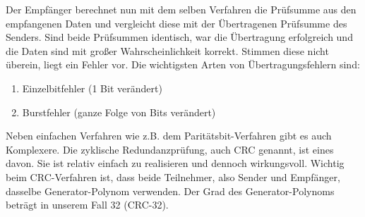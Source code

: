 Der Empfänger berechnet nun mit dem selben Verfahren die Prüfsumme aus den empfangenen Daten und vergleicht diese mit der Übertragenen Prüfsumme des Senders.
Sind beide Prüfsummen identisch, war die Übertragung erfolgreich und die Daten sind mit großer Wahrscheinlichkeit korrekt.
Stimmen diese nicht überein, liegt ein Fehler vor.
Die wichtigsten Arten von Übertragungsfehlern sind:
\begin{enumerate}
    \item Einzelbitfehler (1 Bit verändert)
    \item Burstfehler (ganze Folge von Bits verändert)
\end{enumerate}
Neben einfachen Verfahren wie z.B. dem Paritätsbit-Verfahren gibt es auch Komplexere.
Die zyklische Redundanzprüfung, auch CRC genannt, ist eines davon.
Sie ist relativ einfach zu realisieren und dennoch wirkungsvoll.
Wichtig beim CRC-Verfahren ist, dass beide Teilnehmer, also Sender und Empfänger, dasselbe Generator-Polynom verwenden.
Der Grad des Generator-Polynoms beträgt in unserem Fall 32 (CRC-32).

